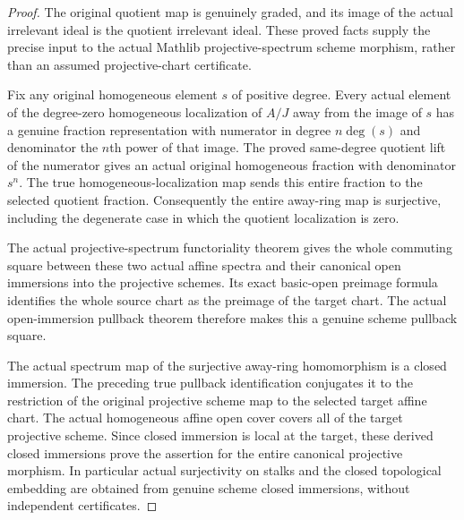\begin{proof}
The original quotient map is genuinely graded, and its image of the
actual irrelevant ideal is the quotient irrelevant ideal. These proved
facts supply the precise input to the actual Mathlib projective-spectrum
scheme morphism, rather than an assumed projective-chart certificate.

Fix any original homogeneous element $s$ of positive degree. Every
actual element of the degree-zero homogeneous localization of $A/J$
away from the image of $s$ has a genuine fraction representation with
numerator in degree $n\deg(s)$ and denominator the $n$th power of that
image. The proved same-degree quotient lift of the numerator gives an
actual original homogeneous fraction with denominator $s^n$. The true
homogeneous-localization map sends this entire fraction to the selected
quotient fraction. Consequently the entire away-ring map is surjective,
including the degenerate case in which the quotient localization is zero.

The actual projective-spectrum functoriality theorem gives the whole
commuting square between these two actual affine spectra and their
canonical open immersions into the projective schemes. Its exact
basic-open preimage formula identifies the whole source chart as the
preimage of the target chart. The actual open-immersion pullback theorem
therefore makes this a genuine scheme pullback square.

The actual spectrum map of the surjective away-ring homomorphism is a
closed immersion. The preceding true pullback identification conjugates
it to the restriction of the original projective scheme map to the
selected target affine chart. The actual homogeneous affine open cover
covers all of the target projective scheme. Since closed immersion is
local at the target, these derived closed immersions prove the assertion
for the entire canonical projective morphism. In particular actual
surjectivity on stalks and the closed topological embedding are obtained
from genuine scheme closed immersions, without independent certificates.
\end{proof}

